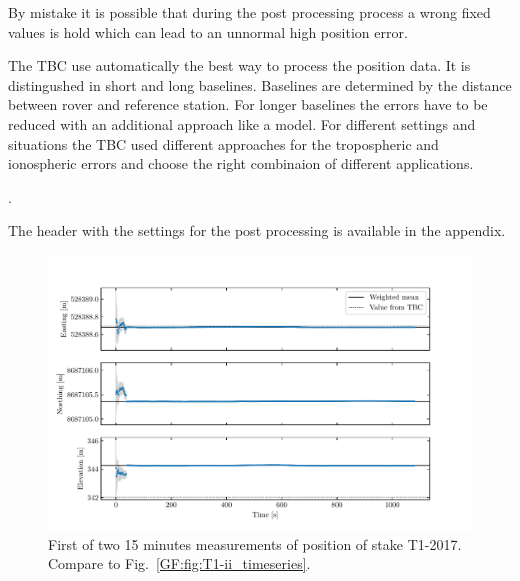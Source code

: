 By mistake it is possible that during the post processing process a wrong fixed values is hold which can lead to an unnormal high position error.

The TBC use automatically the best way to process the position data. 
It is distingushed in short and long baselines.
Baselines are determined by the distance between rover and reference station.
For longer baselines the errors have to be reduced with an additional approach like a model.
For different settings and situations the TBC used different approaches for the tropospheric and ionospheric errors and choose the right combinaion of different applications.

\citep{Trprocess}.

The header with the settings for the post processing is available in the appendix.

\begin{figure}[H]
    \centering
    \includegraphics[width=\textwidth]{./figs/timeseries/46250700_corr-T1-i-2017_Timeseries-east-north-elev.pdf}
    \caption{First of two 15 minutes measurements of position of stake T1-2017. Compare to Fig.~\ref{GF:fig:T1-ii_timeseries}.}
    \label{GF:fig:T1-i_timeseries}
\end{figure}


